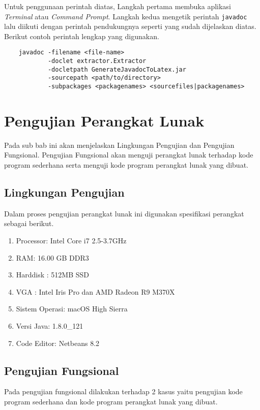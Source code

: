 Untuk penggunaan perintah diatas, Langkah pertama membuka aplikasi {\it Terminal} atau {\it Command Prompt}. Langkah kedua mengetik perintah {\tt javadoc} lalu diikuti dengan perintah pendukungnya seperti yang sudah dijelaskan diatas. Berikut contoh perintah lengkap yang digunakan.

\begin{verbatim}
	javadoc -filename <file-name>
	        -doclet extractor.Extractor
	        -docletpath GenerateJavadocToLatex.jar
	        -sourcepath <path/to/directory>
	        -subpackages <packagenames> <sourcefiles|packagenames>
\end{verbatim}

\section{Pengujian Perangkat Lunak}
\label{sec: pengujian perangkat lunak}
Pada sub bab ini akan menjelaskan Lingkungan Pengujian dan Pengujian Fungsional. Pengujian Fungsional akan menguji perangkat lunak terhadap kode program sederhana serta menguji kode program perangkat lunak yang dibuat.
\subsection{Lingkungan Pengujian}
\label{sec:lingkungan perangkat lunak}
Dalam proses pengujian perangkat lunak ini digunakan spesifikasi perangkat sebagai berikut.

\begin{enumerate}
	\item Processor: Intel Core i7 2.5-3.7GHz 
	\item RAM: 16.00 GB DDR3	
	\item Harddisk : 512MB SSD
	\item VGA : Intel Iris Pro dan AMD Radeon R9 M370X
	\item Sistem Operasi: macOS High Sierra
	\item Versi Java: 1.8.0\_121
	\item Code Editor: Netbeans 8.2
\end{enumerate}

\subsection{Pengujian Fungsional}
\label{sec:pengujian fungsional}
Pada pengujian fungsional dilakukan terhadap 2 kasus yaitu pengujian kode program sederhana dan kode program perangkat lunak yang dibuat.

